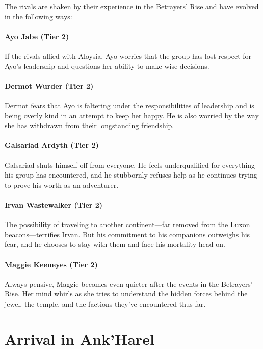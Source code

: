 \documentclass[a4paper, 11pt, bg=full, twocolumn, nooutline]{dndbook}
\begin{document}
The rivals are shaken by their experience in the Betrayers' Rise and have evolved in the following ways:

\paragraph{Ayo Jabe (Tier 2)}

If the rivals allied with Aloysia, Ayo worries that the group has lost respect for Ayo's leadership and questions her ability to make wise decisions.

\paragraph{Dermot Wurder (Tier 2)}

Dermot fears that Ayo is faltering under the responsibilities of leadership and is being overly kind in an attempt to keep her happy. He is also worried by the way she has withdrawn from their longstanding friendship.

\paragraph{Galsariad Ardyth (Tier 2)}

Galsariad shuts himself off from everyone. He feels underqualified for everything his group has encountered, and he stubbornly refuses help as he continues trying to prove his worth as an adventurer.

\paragraph{Irvan Wastewalker (Tier 2)}

The possibility of traveling to another continent---far removed from the Luxon beacons---terrifies Irvan. But his commitment to his companions outweighs his fear, and he chooses to stay with them and face his mortality head-on.

\paragraph{Maggie Keeneyes (Tier 2)}

Always pensive, Maggie becomes even quieter after the events in the Betrayers' Rise. Her mind whirls as she tries to understand the hidden forces behind the jewel, the temple, and the factions they've encountered thus far.
\section{Arrival in Ank'Harel}
\end{document}
